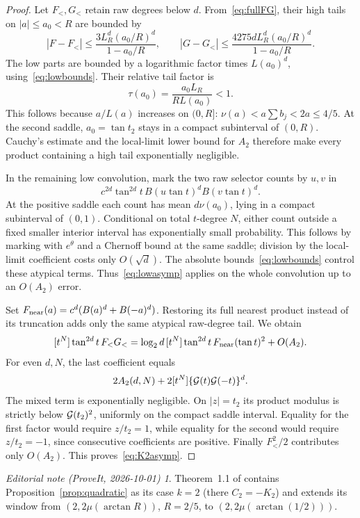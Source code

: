 \documentclass[11pt,a4paper]{article}
\theoremstyle{remark}\newtheorem*{ednote}{Editorial note (ProveIt, 2026-10-01)}
\begin{document}
\begin{proof}
Let $F_<,G_<$ retain raw degrees below $d$. From~\eqref{eq:fullFG}, their high tails on $|a|\le a_0<R$ are bounded by
\[
 |F-F_<|\le\frac{3L_R^d(a_0/R)^d}{1-a_0/R},\qquad
 |G-G_<|\le\frac{4275dL_R^d(a_0/R)^d}{1-a_0/R}.
\]
The low parts are bounded by a logarithmic factor times $L(a_0)^d$, using~\eqref{eq:lowbounds}. Their relative tail factor is
\[
 \tau(a_0)=\frac{a_0L_R}{RL(a_0)}<1.
\]
This follows because $a/L(a)$ increases on $(0,R]$:
$\nu(a)<a\sum b_j<2a\le4/5$. At the second saddle, $a_0=\tan t_2$ stays in a compact subinterval of $(0,R)$. Cauchy's estimate and the local-limit lower bound for $A_2$ therefore make every product containing a high tail exponentially negligible.

In the remaining low convolution, mark the two raw selector counts by $u,v$ in
\[
 c^{2d}\tan^{2d}t\,B(u\tan t)^d B(v\tan t)^d.
\]
At the positive saddle each count has mean $d\nu(a_0)$, lying in a compact subinterval of $(0,1)$. Conditional on total $t$-degree $N$, either count outside a fixed smaller interior interval has exponentially small probability. This follows by marking with $e^{\theta}$ and a Chernoff bound at the same saddle; division by the local-limit coefficient costs only $O(\sqrt d)$. The absolute bounds~\eqref{eq:lowbounds} control these atypical terms. Thus~\eqref{eq:lowasymp} applies on the whole convolution up to an $O(A_2)$ error.

Set $F_{\rm near}(a)=c^d(B(a)^d+B(-a)^d)$. Restoring its full nearest product instead of its truncation adds only the same atypical raw-degree tail. We obtain
\[
 [t^N]\tan^{2d}t\,F_<G_<
 =\log_2d\,[t^N]\tan^{2d}t\,F_{\rm near}(\tan t)^2+O(A_2).
\]
For even $d,N$, the last coefficient equals
\[
 2A_2(d,N)+2[t^N]\{\mathcal G(t)\mathcal G(-t)\}^d.
\]
The mixed term is exponentially negligible. On $|z|=t_2$ its product modulus is strictly below $\mathcal G(t_2)^2$, uniformly on the compact saddle interval. Equality for the first factor would require $z/t_2=1$, while equality for the second would require $z/t_2=-1$, since consecutive coefficients are positive. Finally $F_<^2/2$ contributes only $O(A_2)$. This proves~\eqref{eq:K2asymp}.
\end{proof}
\begin{ednote}
Theorem~1.1 of  contains Proposition~\ref{prop:quadratic}
as its case $k=2$ (there $C_2=-K_2$) and extends its window from $(2,2\mu(\arctan R))$,
$R=2/5$, to $(2,2\mu(\arctan(1/2)))$.
\end{ednote}
\end{document}
